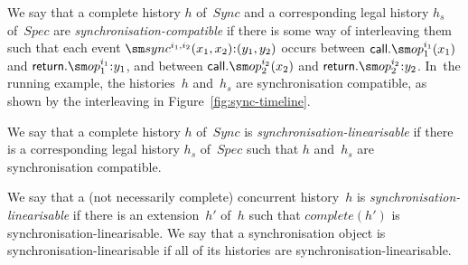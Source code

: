 We say that a complete history $h$ of~$Sync$ and a corresponding legal history
$h_s$ of~$Spec$ are \emph{synchronisation-compatible} if there is some way of
interleaving them such that each event $\sync^{i_1, i_2}(x_1, x_2)\:: (y_1,
y_2)$ occurs between $\call.\op_1^{i_1}(x_1)$ and $\return.\op_1^{i_1}\::y_1$,
and between $\call.\op_2^{i_2}(x_2)$ and $\return.\op_2^{i_2}\::y_2$.
%
In~the running example, the histories~$h$ and~$h_s$ are synchronisation
compatible, as shown by the interleaving in Figure~\ref{fig:sync-timeline}.

We say that a complete history $h$ of~$Sync$ is
\emph{synchronisation-linearisable} if there is a corresponding legal history
$h_s$ of~$Spec$ such that $h$ and~$h_s$ are synchronisation compatible.

We say that a (not necessarily complete) concurrent history~$h$ is
\emph{synchronisation-linearisable} if there is an extension~$h'$ of~$h$ such
that $complete(h')$ is synchronisation-linearisable.  We say that a
synchronisation object is synchronisation-linearisable if all of its histories
are synchronisation-linearisable.



